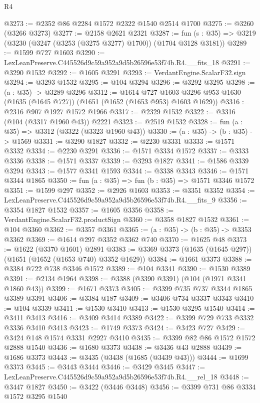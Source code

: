 \begin{lexlean}{R4}
\begin{coremodule}
@3273 := @2352 @86 @2284 @1572 @2322 @1540 @2514 @1700
@3275 := @3260 (@3266 @3273)
@3277 := @2158 @2621 @2321
@3287 := fun (s : @35) => @3219 (@3230 (@3247 (@3253 (@3275 @3277) @1700)) (@1704 @3128 @3181))
@3289 := @1599 @727 @1603
@3290 := LexLeanPreserve.C445526d9c59a952a9d5b26596e53f74b.R4.__fits_18
@3291 := @3290 @1532
@3292 := @1605 @3291
@3293 := VerdantEngine.ScalarF32.sign
@3294 := @3293 @1532
@3295 := @104 @3294
@3296 := @3292 @3295
@3298 := (a : @35) -> @3289 @3296
@3312 := @1614
    @727
    @1603
    @3296
    @953
    @1630
    (@1635 (@1645 @727))
    (@1651 (@1652 (@1653 @953) @1603 @1629))
@3316 := @2316 @907 @1927 @1572 @1966
@3317 := @2329 @1532
@3322 := @3316 (@104 (@3317 @1960 @43)) @2221
@3323 := @2519 @1532
@3328 := fun (a : @35) => @3312 (@3322 (@3323 @1960 @43))
@3330 := (a : @35) -> (b : @35) -> @1569
@3331 := @3290 @1827
@3332 := @2230 @3331
@3333 := @1571 @3332
@3334 := @2230 @3291
@3336 := @1571 @3334 @1572
@3337 := @3333 @3336
@3338 := @1571 @3337
@3339 := @3293 @1827
@3341 := @1586 @3339 @3294
@3343 := @1577 @3341 @1593
@3344 := @3338 @3343
@3346 := @1571 @3344 @1865
@3350 := fun (a : @35) => fun (b : @35) => @1571 @3346 @1572
@3351 := @1599 @297
@3352 := @2926 @1603
@3353 := @3351 @3352
@3354 := LexLeanPreserve.C445526d9c59a952a9d5b26596e53f74b.R4.__fits_9
@3356 := @3354 @1827 @1532
@3357 := @1605 @3356
@3358 := VerdantEngine.ScalarF32.productSign
@3360 := @3358 @1827 @1532
@3361 := @104 @3360
@3362 := @3357 @3361
@3365 := (a : @35) -> (b : @35) -> @3353 @3362
@3369 := @1614 @297 @3352 @3362 @740
@3370 := @1625 @48
@3373 := @1622 (@3370 @1601) @2891
@3383 := @3369 @3373 (@1635 (@1645 @297)) (@1651 (@1652 (@1653 @740) @3352 @1629))
@3384 := @1661 @3373
@3388 := @3384 @722 @738 @3346 @1572
@3389 := @104 @3341
@3390 := @1530 @3389
@3391 := @2134 @1964
@3398 := @3388 (@3390 @3391) (@104 (@1971 @3341 @1860 @43))
@3399 := @1671 @3373
@3405 := @3399 @735 @737 @3344 @1865 @3389 @3391
@3406 := @3384 @187
@3409 := @3406 @734 @3337 @3343
@3410 := @104 @3339
@3411 := @1530 @3410
@3413 := @1530 @3295 @1540
@3414 := @3411 @3413
@3416 := @3409 @3414 @3389
@3422 := @3399 @729 @733 @3332 @3336 @3410 @3413
@3423 := @1749 @3373
@3424 := @3423 @727
@3429 := @3424 @148 @1574 @3331 @2927 @3410
@3435 := @3399 @82 @86 @1572 @1572 @2888 @1540
@3436 := @1680 @3373
@3438 := @3436 @43 @2888
@3439 := @1686 @3373
@3443 := @3435 (@3438 (@1685 (@3439 @43)))
@3444 := @1699 @3373
@3445 := @3443 @3444
@3446 := @3429 @3445
@3447 := LexLeanPreserve.C445526d9c59a952a9d5b26596e53f74b.R4.__rel_18
@3448 := @3447 @1827
@3450 := @3422 (@3446 @3448)
@3456 := @3399 @731 @86 @3334 @1572 @3295 @1540

\end{coremodule}
\end{lexlean}
